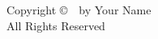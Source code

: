 \vspace*{\fill}
\begin{center}
    \large
    Copyright \copyright\ \the\year\ by Your Name\\
    All Rights Reserved
\end{center}
\vspace*{\fill}
\clearpage 
